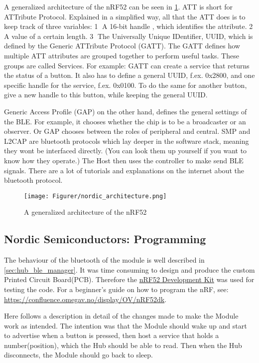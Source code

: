 A generalized architecture of the nRF52 can be seen in \cref{fig:nRF_architecture}. ATT is short for ATTribute Protocol. Explained in a simplified way, all that the ATT does is to keep track of three variables: \textcircled{1} A 16-bit handle , which identifies the attribute. \textcircled{2} A value of a certain length. \textcircled{3} The Universally Unique IDentifier, UUID, which is defined by the Generic ATTribute Protocol (GATT). The GATT defines how multiple ATT attributes are grouped together to perform useful tasks. These groups are called Services. For example: GATT can create a service that returns the status of a button. It also has to define a general UUID, f.ex. 0x2800, and one specific handle for the service, f.ex. 0x0100. To do the same for another button, give a new handle to this button, while keeping the general UUID. 

Generic Access Profile (GAP) on the other hand, defines the general settings of the BLE. For example, it chooses whether the chip is to be a broadcaster or an observer. Or GAP chooses between the roles of  peripheral and central. SMP and L2CAP are bluetooth protocols which lay deeper in the software stack, meaning they wont be interfaced directly. (You can look them up yourself if you want to know how they operate.) The Host then uses the controller to make send BLE signals. 
There are a lot of tutorials and explanations on the internet about the bluetooth protocol.

\begin{figure}
    \centering
    \texttt{[image: Figurer/nordic\_architecture.png]}
    \caption{A generalized architecture of the nRF52}
    \label{fig:nRF_architecture}
\end{figure}

\subsection{Nordic Semiconductors: Programming}
The behaviour of the bluetooth of the module is well described in \cref{sec:hub_ble_manager}.
It was time consuming to design and produce the custom Printed Circuit Board(PCB). Therefore the \href{https://www.nordicsemi.com/Software-and-Tools/Development-Kits/nRF52-DK/Getting-Started}{nRF52 Development Kit} was used for testing the code. For a beginner's guide on how to program the nRF, see: \url{https://confluence.omegav.no/display/OV/nRF52dk}.

Here follows a description in detail of the changes made to make the Module work as intended. The intention was that the Module should wake up and start to advertise when a button is pressed, then host a service that holds a  number(position), which the Hub should be able to read. Then when the Hub disconnects, the Module should go back to sleep.


